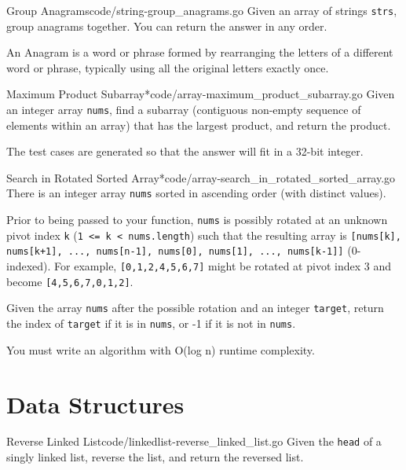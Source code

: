 \documentclass[10pt]{report}
\newcommand{\var}[1]{\texttt{#1}}
\newcommand\blankpage{%
    \clearpage
    \null
    \thispagestyle{empty}%
    \clearpage
}
\begin{document}
\begin{problem}{Group Anagrams}{code/string-group_anagrams.go}
Given an array of strings \var{strs}, group anagrams together. You can return the answer in any order.

An Anagram is a word or phrase formed by rearranging the letters of a different word or phrase, typically using all the original letters exactly once.
\end{problem}

\begin{problem}{Maximum Product Subarray*}{code/array-maximum_product_subarray.go}
Given an integer array \var{nums}, find a subarray (contiguous non-empty sequence of elements within an array) that has the largest product, and return the product.

The test cases are generated so that the answer will fit in a 32-bit integer.
\end{problem}

\begin{problem}{Search in Rotated Sorted Array*}{code/array-search_in_rotated_sorted_array.go}
There is an integer array \var{nums} sorted in ascending order (with distinct values).

Prior to being passed to your function, \var{nums} is possibly rotated at an unknown pivot index \var{k} (\var{1 <= k < nums.length}) such that the resulting array is \var{[nums[k], nums[k+1], ..., nums[n-1], nums[0], nums[1], ..., nums[k-1]]} (0-indexed). For example, \var{[0,1,2,4,5,6,7]} might be rotated at pivot index 3 and become \var{[4,5,6,7,0,1,2]}.

Given the array \var{nums} after the possible rotation and an integer \var{target}, return the index of \var{target} if it is in \var{nums}, or -1 if it is not in \var{nums}.

You must write an algorithm with O(log n) runtime complexity.
\end{problem}


\part{Data Structures}
\blankpage

\begin{problem}{Reverse Linked List}{code/linkedlist-reverse_linked_list.go}
Given the \var{head} of a singly linked list, reverse the list, and return the reversed list.
\end{problem}
\end{document}
